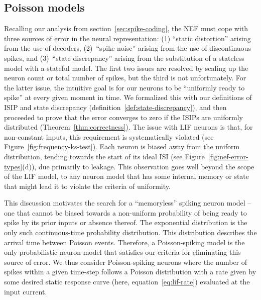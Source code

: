 \subsection{Poisson models}
\label{sec:poisson-spiking}

Recalling our analysis from section~\ref{sec:spike-coding}, the NEF must cope with three sources of error in the neural representation: (1) ``static distortion'' arising from the use of decoders, (2)~``spike noise'' arising from the use of discontinuous spikes, and (3)~``state discrepancy'' arising from the substitution of a stateless model with a stateful model.
The first two issues are resolved by scaling up the neuron count or total number of spikes, but the third is not unfortunately.
For the latter issue, the intuitive goal is for our neurons to be ``uniformly ready to spike'' at every given moment in time.
We formalized this with our definitions of ISIP and state discrepancy (definition~\ref{def:state-discrepancy}), and then proceeded to prove that the error converges to zero if the ISIPs are uniformly distributed (Theorem~\ref{thm:correctness}).
The issue with LIF neurons is that, for non-constant inputs, this requirement is systematically violated (see Figure~\ref{fig:frequency-ks-test}).
Each neuron is biased away from the uniform distribution, tending towards the start of its ideal ISI (see Figure~\ref{fig:nef-error-types}(d)), due primarily to leakage.
This observation goes well beyond the scope of the LIF model, to any neuron model that has some internal memory or state that might lead it to violate the criteria of uniformity.

This discussion motivates the search for a ``memoryless'' spiking neuron model -- one that cannot be biased towards a non-uniform probability of being ready to spike by its prior inputs or absence thereof.
The exponential distribution is the only such continuous-time probability distribution.
This distribution describes the arrival time between Poisson events.
Therefore, a Poisson-spiking model is the only probabilistic neuron model that satisfies our criteria for eliminating this source of error.
We thus consider Poisson-spiking neurons where the number of spikes within a given time-step follows a Poisson distribution with a rate given by some desired static response curve (here, equation~\ref{eq:lif-rate}) evaluated at the input current.

